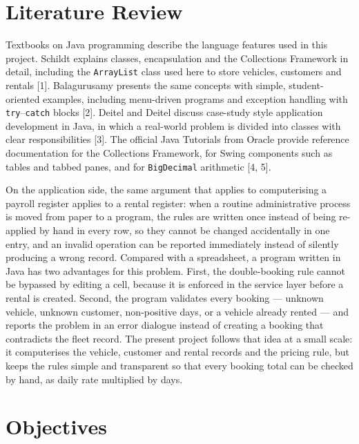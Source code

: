 \documentclass[11pt,a4paper]{article}
\begin{document}
\section{Literature Review}

Textbooks on Java programming describe the language features used in
this project. Schildt explains classes, encapsulation and the
Collections Framework in detail, including the \texttt{ArrayList}
class used here to store vehicles, customers and rentals [1].
Balagurusamy presents the same concepts with simple,
student-oriented examples, including menu-driven programs and
exception handling with \texttt{try}--\texttt{catch} blocks [2].
Deitel and Deitel discuss case-study style application development
in Java, in which a real-world problem is divided into classes with
clear responsibilities [3]. The official Java Tutorials from Oracle
provide reference documentation for the Collections Framework, for
Swing components such as tables and tabbed panes, and for
\texttt{BigDecimal} arithmetic [4, 5].

On the application side, the same argument that applies to
computerising a payroll register applies to a rental register: when
a routine administrative process is moved from paper to a program,
the rules are written once instead of being re-applied by hand in
every row, so they cannot be changed accidentally in one entry, and
an invalid operation can be reported immediately instead of
silently producing a wrong record. Compared with a spreadsheet, a
program written in Java has two advantages for this problem. First,
the double-booking rule cannot be bypassed by editing a cell, because
it is enforced in the service layer before a rental is created.
Second, the program validates every booking --- unknown vehicle,
unknown customer, non-positive days, or a vehicle already rented ---
and reports the problem in an error dialogue instead of creating a
booking that contradicts the fleet record. The present project
follows that idea at a small scale: it computerises the vehicle,
customer and rental records and the pricing rule, but keeps the
rules simple and transparent so that every booking total can be
checked by hand, as daily rate multiplied by days.

\section{Objectives}
\end{document}
